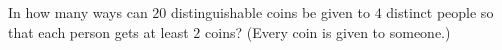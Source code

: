 In how many ways can $20$ distinguishable coins be given to $4$ distinct people so that each person gets at least $2$ coins? (Every coin is given to someone.)
